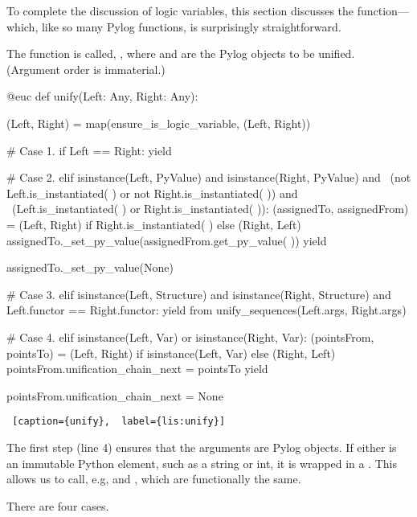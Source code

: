 To complete the discussion of logic variables, this section discusses the  function---which, like so many Pylog functions, is surprisingly straightforward. 

The  function is called, , where  and  are the Pylog objects to be unified. (Argument order is immaterial.) 

\begin{minipage}{\linewidth}  \largev \hrulefill
\begin{python}[numbers=left]
@euc
def unify(Left: Any, Right: Any):

  (Left, Right) = map(ensure_is_logic_variable, (Left, Right))

  # Case 1.
  if Left == Right:
    yield

  # Case 2.
  elif isinstance(Left, PyValue) and isinstance(Right, PyValue) and \
       (not Left.is_instantiated( ) or not Right.is_instantiated( )) and \
       (Left.is_instantiated( ) or Right.is_instantiated( )):
    (assignedTo, assignedFrom) = (Left, Right) if Right.is_instantiated( ) else (Right, Left)
    assignedTo._set_py_value(assignedFrom.get_py_value( ))
    yield

    assignedTo._set_py_value(None)

  # Case 3.
  elif isinstance(Left, Structure) and isinstance(Right, Structure) and Left.functor == Right.functor:
    yield from unify_sequences(Left.args, Right.args)

  # Case 4.
  elif isinstance(Left, Var) or isinstance(Right, Var):
    (pointsFrom, pointsTo) = (Left, Right) if isinstance(Left, Var) else (Right, Left)
    pointsFrom.unification_chain_next = pointsTo
    yield

    pointsFrom.unification_chain_next = None

\end{python}
\begin{lstlisting} [caption={unify},  label={lis:unify}]
\end{lstlisting}
\end{minipage}

The first step (line 4) ensures that the arguments are Pylog objects. If either is an immutable Python element, such as a string or int, it is wrapped in a . This allows us to call, e.g,  and  , which are functionally the same.
   
There are four \textittt{unify} cases.

